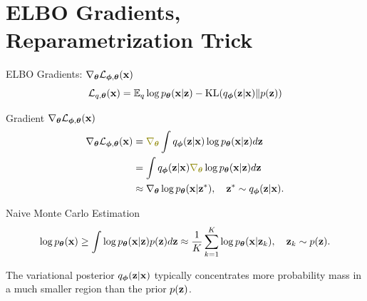 \documentclass{beamer}
\renewcommand{\eqpause}{}
\renewcommand{\nextonslide}[1]{#1}
\begin{document}
\section{ELBO Gradients, Reparametrization Trick}
\begin{frame}{ELBO Gradients: $\nabla_{\boldsymbol{\theta}} \mathcal{L}_{\boldsymbol{\phi}, \boldsymbol{\theta}}(\mathbf{x})$}
	\vspace{-0.3cm}
	\[
	 	\mathcal{L}_{q, \boldsymbol{\theta}}(\mathbf{x}) = \mathbb{E}_{q} \log p_{\boldsymbol{\theta}}(\mathbf{x} | \mathbf{z}) - \mathrm{KL} (q_{\boldsymbol{\phi}}(\mathbf{z}| \mathbf{x}) \| p(\mathbf{z}))
	\]
	\vspace{-0.5cm}
	\eqpause
	\begin{block}{Gradient $\nabla_{\boldsymbol{\theta}} \mathcal{L}_{\boldsymbol{\phi}, \boldsymbol{\theta}}(\mathbf{x})$}
		\vspace{-0.7cm}
		\begin{align*}
			\nabla_{\btheta} \cL_{\bphi, \btheta}(\bx)
			&= {\color{olive}\nabla_{\btheta}} \int q_{\bphi}(\bz| \bx) \log \pt(\bx| \bz) d \bz 
			\nextonslide{\\ &= \int q_{\bphi}(\bz| \bx) {\color{olive}\nabla_{\btheta}} \log \pt(\bx| \bz) d \bz}
			\nextonslide{\\ &\approx \nabla_{\btheta}\log \pt(\bx|\bz^*), \quad \bz^* \sim q_{\bphi}(\bz| \bx).}
		\end{align*}
		\vspace{-0.9cm}
	\end{block}
	\eqpause
	\begin{block}{Naive Monte Carlo Estimation}
		\vspace{-0.7cm}
		\[
			\log p_{\boldsymbol{\theta}}(\mathbf{x}) \geq \int \log p_{\boldsymbol{\theta}}(\mathbf{x} | \mathbf{z}) p(\mathbf{z}) d\mathbf{z} \approx \frac{1}{K} \sum_{k=1}^{K} \log p_{\boldsymbol{\theta}}(\mathbf{x} | \mathbf{z}_k), \quad \mathbf{z}_k \sim p(\mathbf{z}).
		\]
		\vspace{-0.5cm} 
	\end{block}
	\eqpause
	The variational posterior $q_{\boldsymbol{\phi}}(\mathbf{z}| \mathbf{x})$ typically concentrates more probability mass in a much smaller region than the prior $p(\mathbf{z})$. 
\end{frame}
\end{document}
